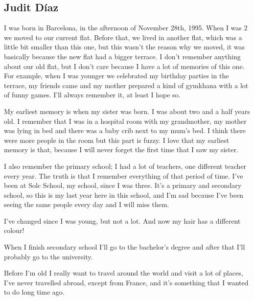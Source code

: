 \subsection*{Judit Díaz}

I was born in Barcelona, in the afternoon of November 28th, 1995. When I was 2 we moved to our current flat. Before that, we lived in another flat, which was a little bit smaller than this one, but this wasn’t the reason why we moved, it was basically because the new flat had a bigger terrace. I don’t remember anything about our old flat, but I don’t care because I have a lot of memories of this one. For example, when I was younger we celebrated my birthday parties in the terrace, my friends came and my mother prepared a kind of gymkhana with a lot of funny games. I’ll always remember it, at least I hope so.  

My earliest memory is when my sister was born. I was about two and a half years old. I remember that I was in a hospital room with my grandmother, my mother was lying in bed and there was a baby crib next to my mum’s bed. I think there were more people in the room but this part is fuzzy. I love that my earliest memory is that, because I will never forget the first time that I saw my sister.

I also remember the primary school; I had a lot of teachers, one different teacher every year. The truth is that I remember everything of that period of time. I’ve been at Solc School, my school, since I was three. It’s a primary and secondary school, so this is my last year here in this school, and I’m sad because I’ve been seeing the same people every day and I will miss them. 

I’ve changed since I was young, but not a lot. And now my hair has a different colour!

When I finish secondary school I’ll go to the bachelor's degree and after that I’ll probably go to the university.

Before I’m old I really want to travel around the world and visit a lot of places, I’ve never travelled abroad, except from France, and it’s something that I wanted to do long time ago.



